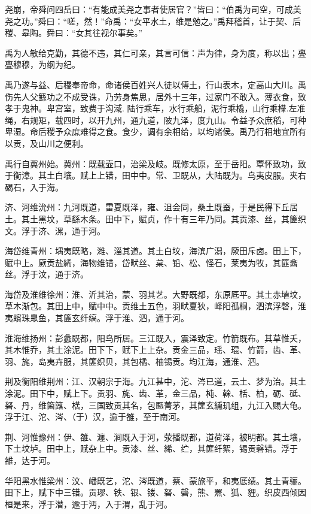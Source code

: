 \documentclass[UTF8,12pt,AutoFakeBold]{ctexart}
\begin{document}
	尧崩，帝舜问四岳曰：“有能成美尧之事者使居官？”皆曰：“伯禹为司空，可成美尧之功。”舜曰：“嗟，然！”命禹：“女平水土，维是勉之。”禹拜稽首，让于契、后稷、皋陶。舜曰：“女其往视尔事矣。”
	
	禹为人敏给克勤，其德不违，其仁可亲，其言可信：声为律，身为度，称以出；亹亹穆穆，为纲为纪。
	
	禹乃遂与益、后稷奉帝命，命诸侯百姓兴人徒以傅土，行山表木，定高山大川。禹伤先人父鲧功之不成受诛，乃劳身焦思，居外十三年，过家门不敢入。薄衣食，致孝于鬼神。卑宫室，致费于沟淢. 陆行乘车，水行乘船，泥行乘橇，山行乘檋.左准绳，右规矩，载四时，以开九州，通九道，陂九泽，度九山。令益予众庶稻，可种卑湿。命后稷予众庶难得之食。食少，调有余相给，以均诸侯。禹乃行相地宜所有以贡，及山川之便利。
	
	禹行自冀州始。冀州：既载壶口，治梁及岐。既修太原，至于岳阳。覃怀致功，致于衡漳。其土白壤。赋上上错，田中中。常、卫既从，大陆既为。鸟夷皮服。夹右碣石，入于海。
	
	济、河维沇州：九河既道，雷夏既泽，雍、沮会同，桑土既蚕，于是民得下丘居土。其土黑坟，草繇木条。田中下，赋贞，作十有三年乃同。其贡漆、丝，其篚织文。浮于济、漯，通于河。
	
	海岱维青州：堣夷既略，潍、淄其道。其土白坟，海滨广潟，厥田斥卤。田上下，赋中上。厥贡盐絺，海物维错，岱畎丝、枲、铅、松、怪石，莱夷为牧，其篚酓丝。浮于汶，通于济。
	
	海岱及淮维徐州：淮、沂其治，蒙、羽其艺。大野既都，东原厎平。其土赤埴坟，草木渐包。其田上中，赋中中。贡维土五色，羽畎夏狄，峄阳孤桐，泗滨浮磬，淮夷蠙珠臮鱼，其篚玄纤缟。浮于淮、泗，通于河。
	
	淮海维扬州：彭蠡既都，阳鸟所居。三江既入，震泽致定。竹箭既布。其草惟夭，其木惟乔，其土涂泥。田下下，赋下上上杂。贡金三品，瑶、琨、竹箭，齿、革、羽、旄，岛夷卉服，其篚织贝，其包橘、柚锡贡。均江海，通淮、泗。
	
	荆及衡阳维荆州：江、汉朝宗于海。九江甚中，沱、涔已道，云土、梦为治。其土涂泥。田下中，赋上下。贡羽、旄、齿、革，金三品，杶、榦、栝、柏，砺、砥、砮、丹，维箘簬、楛，三国致贡其名，包匦菁茅，其篚玄纁玑组，九江入赐大龟。浮于江、沱、涔、（于）汉，逾于雒，至于南河。
	
	荆、河惟豫州：伊、雒、瀍、涧既入于河，荥播既都，道荷泽，被明都。其土壤，下土坟垆。田中上，赋杂上中。贡漆、丝、絺、纻，其篚纤絮，锡贡磬错。浮于雒，达于河。
	
	华阳黑水惟梁州：汶、嶓既艺，沱、涔既道，蔡、蒙旅平，和夷厎绩。其土青骊。田下上，赋下中三错。贡璆、铁、银、镂、砮、磬，熊、罴、狐、貍。织皮西倾因桓是来，浮于潜，逾于沔，入于渭，乱于河。
	
\end{document}
